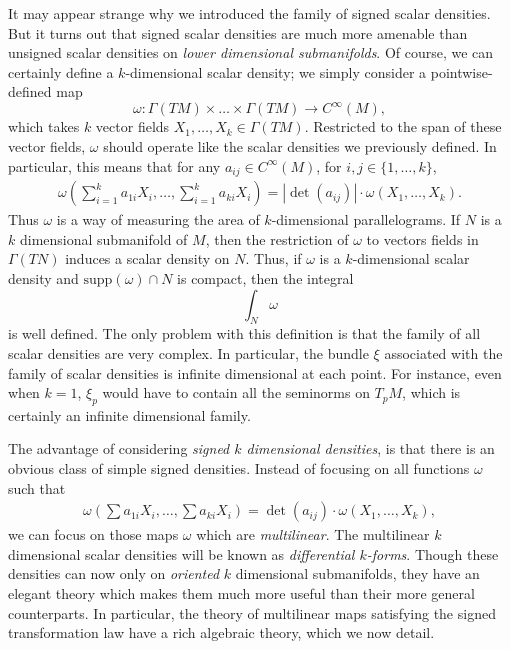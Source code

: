 It may appear strange why we introduced the family of signed scalar densities. But it turns out that signed scalar densities are much more amenable than unsigned scalar densities on \emph{lower dimensional submanifolds}. Of course, we can certainly define a $k$-dimensional scalar density; we simply consider a pointwise-defined map
%
\[ \omega: \Gamma(TM) \times \dots \times \Gamma(TM) \to C^\infty(M), \]
%
which takes $k$ vector fields $X_1, \dots, X_k \in \Gamma(TM)$. Restricted to the span of these vector fields, $\omega$ should operate like the scalar densities we previously defined. In particular, this means that for any $a_{ij} \in C^\infty(M)$, for $i,j \in \{ 1, \dots, k \}$,
%
\begin{align*}
    \omega \left( \sum_{i = 1}^k a_{1i} X_i, \dots, \sum_{i = 1}^k a_{ki} X_i \right) = |\det(a_{ij})| \cdot \omega(X_1, \dots, X_k). 
\end{align*}
%
Thus $\omega$ is a way of measuring the area of $k$-dimensional parallelograms. If $N$ is a $k$ dimensional submanifold of $M$, then the restriction of $\omega$ to vectors fields in $\Gamma(TN)$ induces a scalar density on $N$. Thus, if $\omega$ is a $k$-dimensional scalar density and $\text{supp}(\omega) \cap N$ is compact, then the integral
%
\[ \int_N \omega \]
%
is well defined. The only problem with this definition is that the family of all scalar densities are very complex. In particular, the bundle $\xi$ associated with the family of scalar densities is infinite dimensional at each point. For instance, even when $k = 1$, $\xi_p$ would have to contain all the seminorms on $T_p M$, which is certainly an infinite dimensional family.

The advantage of considering \emph{signed $k$ dimensional densities}, is that there is an obvious class of simple signed densities. Instead of focusing on all functions $\omega$ such that
%
\begin{align*}
    \omega \left( \sum a_{1i} X_i, \dots, \sum a_{ki} X_i \right) = \det(a_{ij}) \cdot \omega(X_1, \dots, X_k),
\end{align*}
%
we can focus on those maps $\omega$ which are \emph{multilinear}. The multilinear $k$ dimensional scalar densities will be known as \emph{differential $k$-forms}. Though these densities can now only on \emph{oriented} $k$ dimensional submanifolds, they have an elegant theory which makes them much more useful than their more general counterparts. In particular, the theory of multilinear maps satisfying the signed transformation law have a rich algebraic theory, which we now detail.

